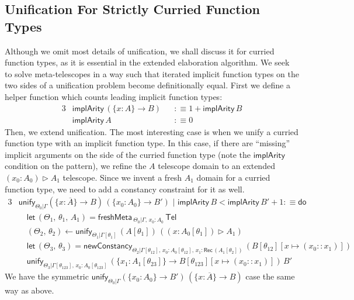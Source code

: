 \documentclass[acmsmall,screen,dvipsnames]{acmart}\settopmatter{}
\newcommand{\slet}{\boldsymbol{\mathsf{let}}}
\newcommand{\freshMeta}[3]{\mathsf{freshMeta}\,_{#1|#2}\,#3}
\newcommand{\newConstancy}[5]{\mathsf{newConstancy}_{#1|#2,\,#3 : \Rec\,#4}\,#5}
\newcommand{\unify}{\mathsf{unify}}
\newcommand{\edo}{\boldsymbol{\mathsf{do}}}
\newcommand{\Tel}{\mathsf{Tel}}
\newcommand{\TCons}{\triangleright}
\newcommand{\Rec}{\mathsf{Rec}}
\newcommand{\ol}[1]{\overline{#1}}
\newcommand{\implArity}{\mathsf{implArity}}
\theoremstyle{remark}
\begin{document}
\subsection{Unification For Strictly Curried Function Types}
\label{sec:curriedunif}
Although we omit most details of unification, we shall discuss it for curried
function types, as it is essential in the extended elaboration algorithm. We
seek to solve meta-telescopes in a way such that iterated implicit function
types on the two sides of a unification problem become definitionally
equal. First we define a helper function which counts leading implicit function
types:
\begin{alignat*}{3}
  & \implArity\,(\{x : A\}\to B) && :\equiv 1 + \implArity\,B\\
  & \implArity\,A                && :\equiv 0
\end{alignat*}
Then, we extend unification. The most interesting case is when we unify a
curried function type with an implicit function type. In this case, if there are
``missing'' implicit arguments on the side of the curried function type (note
the $\implArity$ condition on the pattern), we refine the $A$ telescope domain
to an extended $(x_0 : A_0) \TCons A_1$ telescope. Since we invent a fresh $A_1$
domain for a curried function type, we need to add a constancy constraint for it
as well.
\begin{alignat*}{3}
& \unify_{\Theta_0|\Gamma}(\{x : \ol{A}\}\to B)\,(\{x_0 : A_0\}\to B')\,\,|\,\,\implArity\,B < \implArity\,B' + 1 :\equiv \edo\\
& \quad \slet\,(\Theta_1,\,\theta_1,\,A_1) = \freshMeta{\Theta_0}{\Gamma,\,x_0 : A_0}{\Tel}\\
& \quad (\Theta_2,\,\theta_2) \leftarrow
  \unify_{\Theta_1|\Gamma[\theta_1]}\,(A[\theta_1])\,((x : A_0[\theta_1])\TCons A_1)\\
& \quad \slet\,(\Theta_3,\,\theta_3) =
    \newConstancy{\Theta_2}{\Gamma[\theta_{12}],\,x_0 : A_0[\theta_{12}]}{x_1}{(A_1[\theta_2])}{(B[\theta_{12}][x\mapsto (x_0 :: x_1)])}\\
& \quad\unify_{\Theta_3|\Gamma[\theta_{123}],\,x_0 : A_0[\theta_{123}]}\,
         (\{x_1 : A_1[\theta_{23}]\}\to B[\theta_{123}][x\mapsto (x_0 :: x_1)])\,B'
\end{alignat*}
We have the symmetric $\unify_{\Theta_0|\Gamma}(\{x_0 : A_0\}\to B')\,(\{x :
\ol{A}\}\to B)$ case the same way as above.
\end{document}
